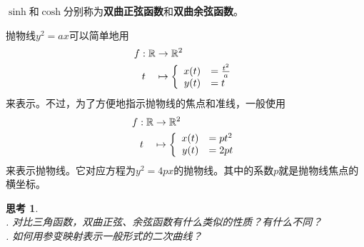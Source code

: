 \documentclass[12pt,UTF8]{ctexbook}
\theoremstyle{definition}
\theoremstyle{plain}
\newtheorem{sk}{思考}[section]
\begin{document}
$\sinh$和$\cosh$分别称为\textbf{双曲正弦函数}和\textbf{双曲余弦函数}。

抛物线$y^2 = ax$可以简单地用
\begin{align*}
    f: \mathbb{R} &\rightarrow \mathbb{R}^2 \\
    t\quad &\mapsto\left\{
        \begin{array}[]{rl}
            x(t) &= \frac{t^2}{a} \\
            y(t) &= t \\
        \end{array}
    \right.
\end{align*}
来表示。不过，为了方便地指示抛物线的焦点和准线，一般使用
\begin{align*}
    f: \mathbb{R} &\rightarrow \mathbb{R}^2 \\
    t\quad &\mapsto\left\{
        \begin{array}[]{rl}
            x(t) &= pt^2 \\
            y(t) &= 2pt \\
        \end{array}
    \right.
\end{align*}
来表示抛物线。它对应方程为$y^2 = 4px$的抛物线。其中的系数$p$就是抛物线焦点的横坐标。

\begin{sk}
    \mbox{} \\
    . 对比三角函数，双曲正弦、余弦函数有什么类似的性质？有什么不同？\\
    . 如何用参变映射表示一般形式的二次曲线？\\
\end{sk}
\end{document}
